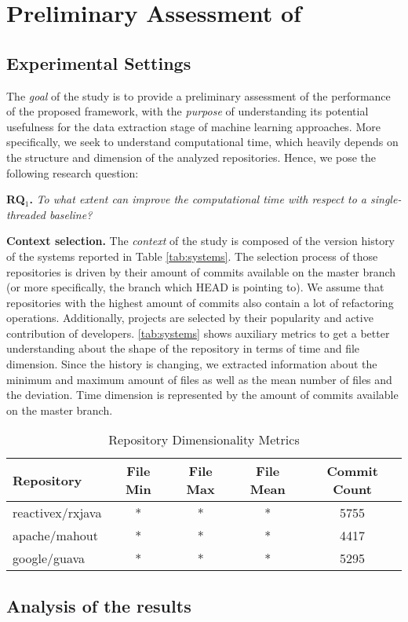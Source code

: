 
\section{Preliminary Assessment of \iris}
\label{sec:assessment}

\subsection{Experimental Settings}
\label{sec:method}
The \emph{goal} of the study is to provide a preliminary assessment of the performance of the proposed framework, with the \emph{purpose} of understanding its potential usefulness for the data extraction stage of machine learning approaches. More specifically, we seek to understand computational time, which heavily depends on the structure and dimension of the analyzed repositories. Hence, we pose the following research question:

\begin{center}
	\begin{examplebox}
		\textbf{RQ$_1$.} \emph{To what extent can \iris improve the computational time with respect to a single-threaded baseline?}	
	\end{examplebox}
\end{center}

\textbf{Context selection.} The \emph{context} of the study is composed of the version history of the systems reported in Table \ref{tab:systems}. The selection process of those repositories is driven by their amount of commits available on the master branch (or more specifically, the branch which HEAD is pointing to). We assume that repositories with the highest amount of commits also contain a lot of refactoring operations. Additionally, projects are selected by their popularity and active contribution of developers. \ref{tab:systems} shows auxiliary metrics to get a better understanding about the shape of the repository in terms of time and file dimension. Since the history is changing, we extracted information about the minimum and maximum amount of files as well as the mean number of files and the deviation. Time dimension is represented by the amount of commits available on the master branch.

\begin{table}[htbp]
\caption{Repository Dimensionality Metrics}
\label{tab:systems}
\begin{center}
\begin{tabular}{|l|c|c|c|c|}
\hline
\textbf{Repository}&\textbf{File Min}&\textbf{File Max}&\textbf{File Mean}&\textbf{Commit Count}\\
\hline
reactivex/rxjava& * & * & * & 5755\\
\hline
apache/mahout& * & * & * & 4417\\
\hline
google/guava& * & * & * & 5295\\
\hline
\end{tabular}
\label{tab2}
\end{center}
\end{table}

\subsection{Analysis of the results}
\label{sec:results}

